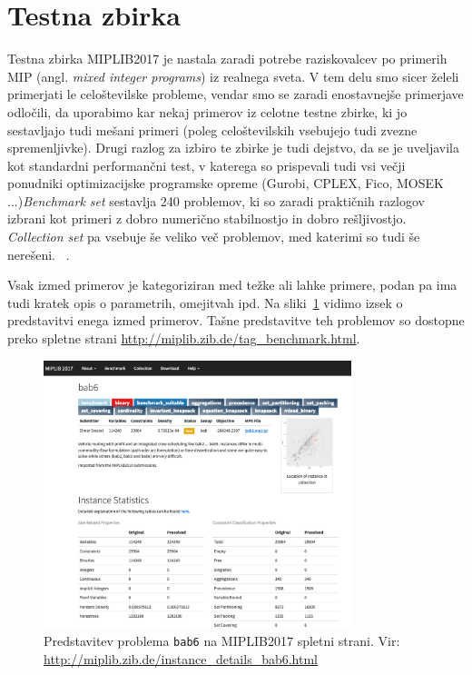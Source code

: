 \documentclass[a4paper,11pt]{article}
\begin{document}
\section{Testna zbirka}
\label{benchmark_data}
Testna zbirka MIPLIB2017 je nastala zaradi potrebe raziskovalcev po primerih MIP (angl. \textit{mixed integer programs}) iz realnega sveta. V tem delu smo sicer želeli primerjati le celoštevilske probleme, vendar smo se zaradi enostavnejše primerjave odločili, da uporabimo kar nekaj primerov iz celotne testne zbirke, ki jo sestavljajo tudi mešani primeri (poleg celoštevilskih vsebujejo tudi zvezne spremenljivke). Drugi razlog za izbiro te zbirke je tudi dejstvo, da se je uveljavila kot standardni performančni test, v katerega so prispevali tudi vsi večji ponudniki optimizacijske programske opreme (Gurobi, CPLEX, Fico, MOSEK ...)\textit{Benchmark set} sestavlja 240 problemov, ki so zaradi praktičnih razlogov izbrani kot primeri z dobro numerično stabilnostjo in dobro rešljivostjo. \textit{Collection set} pa vsebuje še veliko več problemov, med katerimi so tudi še nerešeni. ~\cite{Miplib:2017}.

Vsak izmed primerov je kategoriziran med težke ali lahke primere, podan pa ima tudi kratek opis o parametrih, omejitvah ipd. Na sliki~\ref{img:miplib_sample_set} vidimo izsek o predstavitvi enega izmed primerov. Tašne predstavitve teh problemov so dostopne preko spletne strani \url{http://miplib.zib.de/tag_benchmark.html}.
\begin{figure}[htpb]
	\centering
	\includegraphics[width=0.8\textwidth]{images/miplib_sample_set.png}
	\caption{Predstavitev problema \texttt{bab6} na MIPLIB2017 spletni strani. \footnotesize Vir: \url{http://miplib.zib.de/instance_details_bab6.html}}
	\label{img:miplib_sample_set}
\end{figure}
\end{document}
